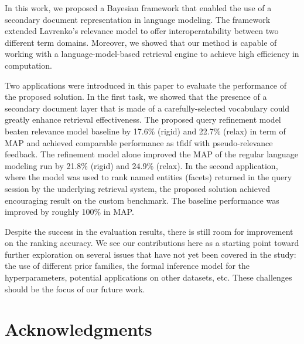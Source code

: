 In this work, we proposed a Bayesian framework that enabled the use of a
secondary document representation in language modeling.  The framework extended
Lavrenko's relevance model to offer interoperatability between two different
term domains.  Moreover, we showed that our method is capable of working with a
language-model-based retrieval engine to achieve high efficiency in
computation.  

Two applications were introduced in this paper to evaluate the performance of
the proposed solution.  In the first task, we showed that the presence of a
secondary document layer that is made of a carefully-selected vocabulary could
greatly enhance retrieval effectiveness.  The proposed query refinement model
beaten relevance model baseline by 17.6\% (rigid) and 22.7\% (relax) in term of
MAP and achieved comparable performance as tfidf with pseudo-relevance
feedback.  The refinement model alone improved the MAP of the regular language
modeling run by 21.8\% (rigid) and 24.9\% (relax).  In the second application,
where the model was used to rank named entities (facets) returned in the query
session by the underlying retrieval system, the proposed solution achieved
encouraging result on the custom benchmark.  The baseline performance was
improved by roughly 100\% in MAP.  

Despite the success in the evaluation results, there is still room for
improvement on the ranking accuracy.  We see our contributions here as a
starting point toward further exploration on several issues that have not yet
been covered in the study: the use of different prior families, the formal
inference model for the hyperparameters, potential applications on other
datasets, etc.  These challenges should be the focus of our future work.


\section*{Acknowledgments}

